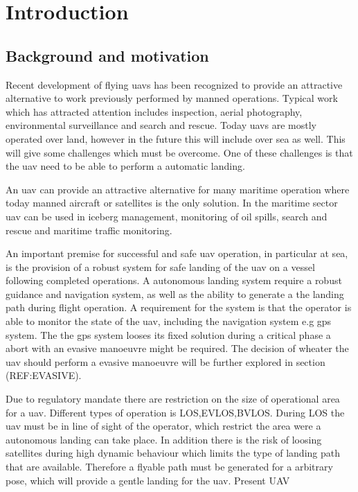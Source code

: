 
\chapter{Introduction}

\section{Background and motivation}
Recent development of flying \glspl{uav} has been recognized to provide an attractive alternative to work previously performed by manned operations. Typical work which has attracted attention includes inspection, aerial photography, environmental surveillance and search and rescue. Today \glspl{uav} are mostly operated over land, however in the future this will include over sea as well. This will give some challenges which must be overcome. One of these challenges is that the \gls{uav} need to be able to perform a automatic landing.

An \gls{uav} can provide an attractive alternative for many maritime operation where today manned aircraft or satellites is the only solution. In the maritime sector \gls{uav} can be used in iceberg management, monitoring of oil spills, search and rescue and maritime traffic monitoring.

An important premise for successful and safe \gls{uav} operation, in particular at sea, is the provision of a robust system for safe landing of the \gls{uav} on a vessel following completed operations. A autonomous landing system require a robust guidance and navigation system, as well as the ability to generate a the landing path during flight operation. A requirement for the system is that the operator is able to monitor the state of the uav, including the navigation system e.g gps system. The the gps system looses its fixed solution during a critical phase a abort with an evasive manoeuvre might be required. The decision of wheater the uav should perform a evasive manoeuvre will be further explored in section (REF:EVASIVE).

Due to regulatory mandate there are restriction on the size of operational area for a uav. Different types of operation is LOS,EVLOS,BVLOS. During LOS the uav must be in line of sight of the operator, which restrict the area were a autonomous landing can take place. In addition there is the risk of loosing satellites during high dynamic behaviour which limits the type of landing path that are available. Therefore a flyable path must be generated for a arbitrary pose, which will provide a gentle landing for the uav. 
Present UAV

